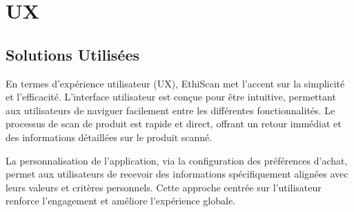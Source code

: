 \section{UX}

\subsection{Solutions Utilisées}

En termes d'expérience utilisateur (UX), EthiScan met l'accent sur la simplicité et l'efficacité. L'interface utilisateur est conçue pour être intuitive, permettant aux utilisateurs de naviguer facilement entre les différentes fonctionnalités. Le processus de scan de produit est rapide et direct, offrant un retour immédiat et des informations détaillées sur le produit scanné.

La personnalisation de l'application, via la configuration des préférences d'achat, permet aux utilisateurs de recevoir des informations spécifiquement alignées avec leurs valeurs et critères personnels. Cette approche centrée sur l'utilisateur renforce l'engagement et améliore l'expérience globale.